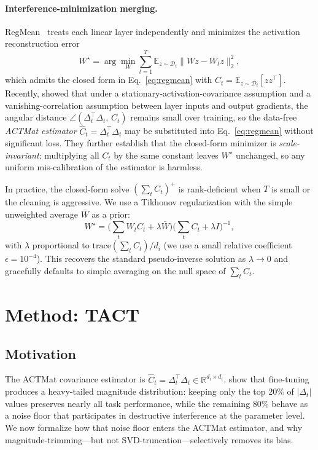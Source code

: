\documentclass{article}
\theoremstyle{plain}
\theoremstyle{definition}
\theoremstyle{remark}
\begin{document}
\paragraph{Interference-minimization merging.}
RegMean~\citep{jin2023dataless} treats each linear layer independently and minimizes the activation reconstruction error
\begin{equation}
W^\star = \arg\min_W \sum_{t=1}^{T} \mathbb{E}_{z\sim\mathcal{D}_t}\big\|Wz - W_t z\big\|_2^2,
\label{eq:obj}
\end{equation}
which admits the closed form in Eq.~\eqref{eq:regmean} with $C_t = \mathbb{E}_{z\sim\mathcal{D}_t}[z z^\top]$. Recently, \citet{hameed2026actmat} showed that under a stationary-activation-covariance assumption and a vanishing-correlation assumption between layer inputs and output gradients, the angular distance $\angle(\Delta_t^\top \Delta_t,\, C_t)$ remains small over training, so the data-free \emph{ACTMat estimator} $\hat{C}_t = \Delta_t^\top \Delta_t$ may be substituted into Eq.~\eqref{eq:regmean} without significant loss. They further establish that the closed-form minimizer is \emph{scale-invariant}: multiplying all $C_t$ by the same constant leaves $W^\star$ unchanged, so any uniform mis-calibration of the estimator is harmless.

In practice, the closed-form solve $(\sum_t C_t)^+$ is rank-deficient when $T$ is small or the cleaning is aggressive. We use a Tikhonov regularization with the simple unweighted average $\bar{W}$ as a prior:
\begin{equation}
W^\star = \Big(\sum_t W_t C_t + \lambda \bar W\Big)\Big(\sum_t C_t + \lambda I\Big)^{-1},
\label{eq:tikhonov}
\end{equation}
with $\lambda$ proportional to $\mathrm{trace}(\sum_t C_t)/d_i$ (we use a small relative coefficient $\epsilon = 10^{-4}$). This recovers the standard pseudo-inverse solution as $\lambda \to 0$ and gracefully defaults to simple averaging on the null space of $\sum_t C_t$.

\section{Method: TACT}
\label{sec:method}

\subsection{Motivation}

The ACTMat covariance estimator is $\hat{C}_t = \Delta_t^\top \Delta_t \in \mathbb{R}^{d_i \times d_i}$. \citet{yadav2023ties} show that fine-tuning produces a heavy-tailed magnitude distribution: keeping only the top $20\%$ of $|\Delta_t|$ values preserves nearly all task performance, while the remaining $80\%$ behave as a noise floor that participates in destructive interference at the parameter level. We now formalize how that noise floor enters the ACTMat estimator, and why magnitude-trimming---but not SVD-truncation---selectively removes its bias.
\end{document}

